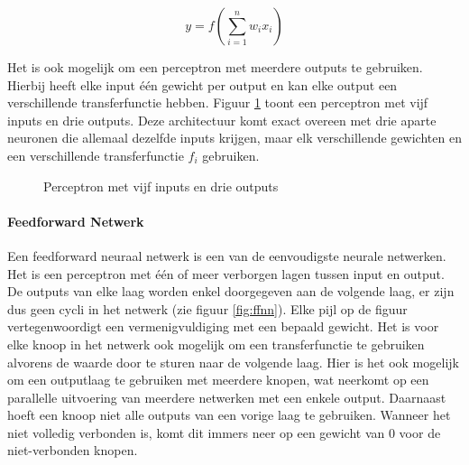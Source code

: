 \begin{equation}
    y = f(\sum\limits_{i=1}^{n}w_i x_i)
    \label{formule:neuron}
\end{equation}

Het is ook mogelijk om een perceptron met meerdere outputs te gebruiken. Hierbij heeft elke input \'e\'en gewicht per output en kan elke output een verschillende transferfunctie hebben. Figuur \ref{fig:perceptron} toont een perceptron met vijf inputs en drie outputs. Deze architectuur komt exact overeen met drie aparte neuronen die allemaal dezelfde inputs krijgen, maar elk verschillende gewichten en een verschillende transferfunctie $f_i$ gebruiken.

\begin{figure}[ht]
\def\layersep{2.5cm}
\centering
{}
\caption{Perceptron met vijf inputs en drie outputs}
\label{fig:perceptron}
\end{figure}


\paragraph{Feedforward Netwerk}
\label{par:concept}
Een feedforward neuraal netwerk is een van de eenvoudigste neurale netwerken. Het is een perceptron met \'e\'en of meer verborgen lagen tussen input en output. De outputs van elke laag worden enkel doorgegeven aan de volgende laag, er zijn dus geen cycli in het netwerk (zie figuur \ref{fig:ffnn}). Elke pijl op de figuur vertegenwoordigt een vermenigvuldiging met een bepaald gewicht. Het is voor elke knoop in het netwerk ook mogelijk om een transferfunctie te gebruiken alvorens de waarde door te sturen naar de volgende laag. Hier is het ook mogelijk om een outputlaag te gebruiken met meerdere knopen, wat neerkomt op een parallelle uitvoering van meerdere netwerken met een enkele output.\cite{Bishop:1995:NNP:525960} Daarnaast hoeft een knoop niet alle outputs van een vorige laag te gebruiken. Wanneer het niet volledig verbonden is, komt dit immers neer op een gewicht van 0 voor de niet-verbonden knopen.

